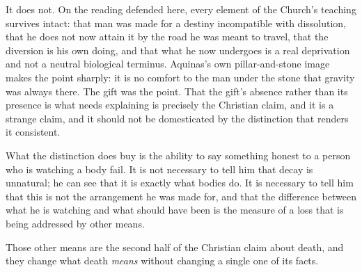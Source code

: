 It does not. On the reading defended here, every element of the Church's teaching survives intact: that man was made for a destiny incompatible with dissolution, that he does not now attain it by the road he was meant to travel, that the diversion is his own doing, and that what he now undergoes is a real deprivation and not a neutral biological terminus. Aquinas's own pillar-and-stone image makes the point sharply: it is no comfort to the man under the stone that gravity was always there. The gift was the point. That the gift's absence rather than its presence is what needs explaining is precisely the Christian claim, and it is a strange claim, and it should not be domesticated by the distinction that renders it consistent.

What the distinction does buy is the ability to say something honest to a person who is watching a body fail. It is not necessary to tell him that decay is unnatural; he can see that it is exactly what bodies do. It is necessary to tell him that this is not the arrangement he was made for, and that the difference between what he is watching and what should have been is the measure of a loss that is being addressed by other means.

Those other means are the second half of the Christian claim about death, and they change what death \emph{means} without changing a single one of its facts.

